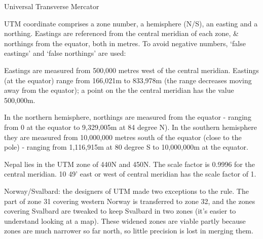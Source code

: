 \documentclass[11pt,dvipsnames,ignorenonframetext,aspectratio=169]{beamer}
\begin{document}
\begin{frame}{Universal Transverse Mercator}
\protect\hypertarget{universal-transverse-mercator}{}
\footnotesize

UTM coordinate comprises a zone number, a hemisphere (N/S), an easting
and a northing. Eastings are referenced from the central meridian of
each zone, \& northings from the equator, both in metres. To avoid
negative numbers, `false eastings' and `false northings' are used:

Eastings are measured from 500,000 metres west of the central meridian.
Eastings (at the equator) range from 166,021m to 833,978m (the range
decreases moving away from the equator); a point on the the central
meridian has the value 500,000m.

In the northern hemisphere, northings are measured from the equator -
ranging from 0 at the equator to 9,329,005m at 84 degree N). In the
southern hemisphere they are measured from 10,000,000 metres south of
the equator (close to the pole) - ranging from 1,116,915m at 80 degree S
to 10,000,000m at the equator.

Nepal lies in the UTM zone of 440N and 450N. The scale factor is 0.9996
for the central meridian. 10 49' east or west of central meridian has
the scale factor of 1.

\scriptsize

Norway/Svalbard: the designers of UTM made two exceptions to the rule.
The part of zone 31 covering western Norway is transferred to zone 32,
and the zones covering Svalbard are tweaked to keep Svalbard in two
zones (it's easier to understand looking at a map). These widened zones
are viable partly because zones are much narrower so far north, so
little precision is lost in merging them.
\end{frame}
\end{document}
